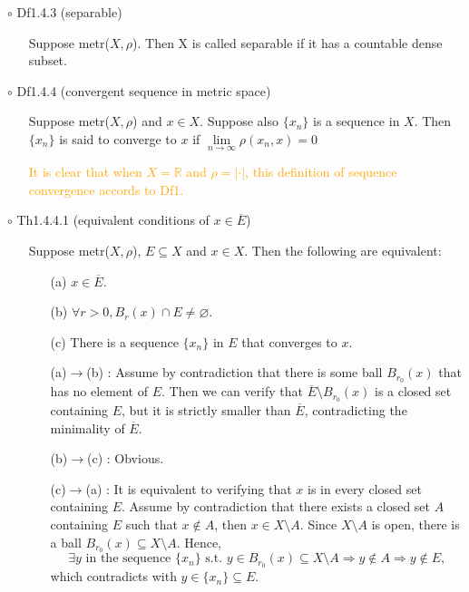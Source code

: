 \documentclass{article}
\begin{document}
{\Large $\circ $ Df1.4.3 (separable)}\par
\begin{itemize}
    \item[]
    {\large Suppose metr($X, \rho$). Then X is called separable if it has a countable dense subset.}
\end{itemize}\par
\quad

{\Large $\circ $ Df1.4.4 (convergent sequence in metric space)}\par
\begin{itemize}
    \item[]
    {\large Suppose metr($X, \rho$) and $x\in X$. Suppose also $\{x_n\}$ is a sequence in $X$. 
    Then $\{x_n\}$ is said to converge to $x$ if $\lim\limits_{n \to \infty} \rho(x_n,x)=0 $}\par
    {\textcolor{orange}{It is clear that when $X=\mathbb{R}$ and $\rho=|\cdot|$, this definition
    of sequence convergence accords to Df1.}}
\end{itemize}\par
\quad

{\Large $\circ $ Th1.4.4.1 (equivalent conditions of $x\in \overline{E}$)}\par
\begin{itemize}
    \item[]
    {\large Suppose metr($X, \rho$), $E\subseteq X$ and $x\in X$. Then the following are equivalent:
    \begin{enumerate}
        \item[(a)] $x\in \overline{E}$.
        \item[(b)] $\forall r>0, B_r(x)\cap E\neq \varnothing$.
        \item[(c)] There is a sequence $\{x_n\}$ in $E$ that converges to $x$.
    \end{enumerate}}
    {\textcolor{pf}{
        \begin{enumerate}
            \item[(a)$\rightarrow$(b)]: Assume by contradiction that there is some ball $B_{r_0}(x)$
            that has no element of $E$. Then we can verify that $\overline{E}\setminus B_{r_0}(x)$ is
            a closed set containing $E$, but it is strictly smaller than $\overline{E}$, contradicting
            the minimality of $\overline{E}$.  
            \item[(b)$\rightarrow$(c)]: Obvious.
            \item[(c)$\rightarrow$(a)]: It is equivalent to verifying that $x$ is in every closed set  
            containing $E$. Assume by contradiction that there exists a closed set $A$ containing $E$
            such that $x\notin A$, then $x\in X\setminus A$. Since $X\setminus A$ is open, there is a
            ball $B_{r_0}(x) \subseteq X\setminus A$. Hence,
            $$\exists y \text{ in the sequence } \{x_n\} \text{ s.t. } y\in B_{r_0}(x) \subseteq X\setminus A
            \Rightarrow y\notin A \Rightarrow y\notin E,$$ which contradicts with $y\in \{x_n\}\subseteq E$.
        \end{enumerate}
    }}
\end{itemize}\par
\quad
\end{document}
